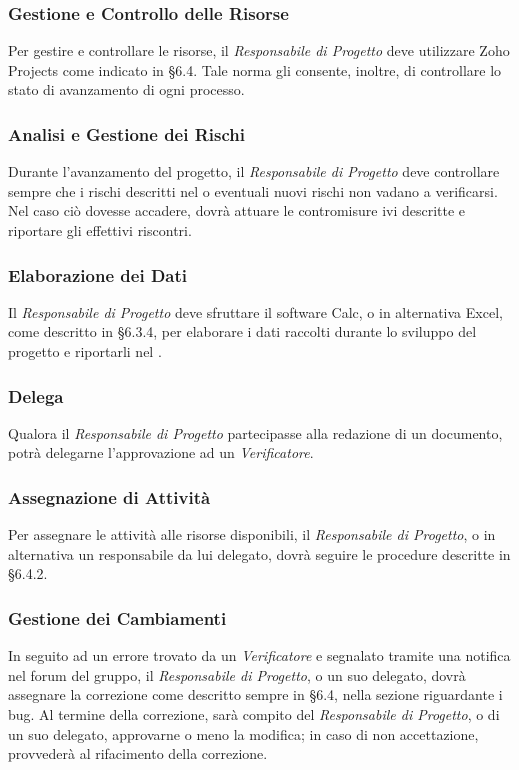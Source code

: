 \subsubsection{Gestione e Controllo delle Risorse}
Per gestire e controllare le risorse, il \textit{Responsabile di Progetto} deve utilizzare Zoho Projects come indicato in §6.4. Tale norma gli consente, inoltre, di controllare lo stato di avanzamento di ogni processo.

\subsubsection{Analisi e Gestione dei Rischi}
Durante l'avanzamento del progetto, il \textit{Responsabile di Progetto} deve controllare sempre che i rischi descritti nel \PianoDiProgetto{} o eventuali nuovi rischi non vadano a verificarsi. Nel caso ciò dovesse accadere, dovrà attuare le contromisure ivi descritte e riportare gli effettivi riscontri.

\subsubsection{Elaborazione dei Dati}
Il \textit{Responsabile di Progetto} deve sfruttare il software Calc, o in alternativa Excel, come descritto in §6.3.4, per elaborare i dati raccolti durante lo sviluppo del progetto e riportarli nel \PianoDiProgetto{}.

\subsubsection{Delega}
Qualora il \textit{Responsabile di Progetto} partecipasse alla redazione di un documento, potrà delegarne l'approvazione ad un \textit{Verificatore}.

\subsubsection{Assegnazione di Attività}
Per assegnare le attività alle risorse disponibili, il \textit{Responsabile di Progetto}, o in alternativa un responsabile da lui delegato, dovrà seguire le procedure descritte in §6.4.2.

\subsubsection{Gestione dei Cambiamenti}
In seguito ad un errore trovato da un \textit{Verificatore} e segnalato tramite una notifica nel forum del gruppo, il \textit{Responsabile di Progetto}, o un suo delegato, dovrà assegnare la correzione come descritto sempre in §6.4, nella sezione riguardante i bug. Al termine della correzione, sarà compito del \textit{Responsabile di Progetto}, o di un suo delegato, approvarne o meno la modifica; in caso di non accettazione, provvederà al rifacimento della correzione.

